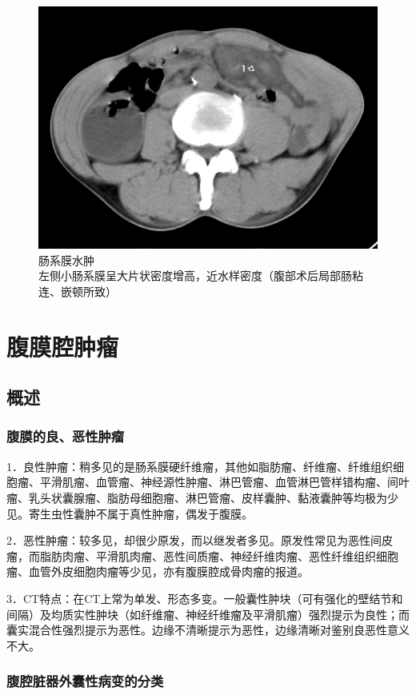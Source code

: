\begin{figure}[!htbp]
 \centering
 \includegraphics[width=.7\textwidth,height=\textheight,keepaspectratio]{./images/Image00376.jpg}
 \captionsetup{justification=centering}
 \caption{肠系膜水肿\\{\small 左侧小肠系膜呈大片状密度增高，近水样密度（腹部术后局部肠粘连、嵌顿所致）}}
 \label{fig18-6}
  \end{figure} 

\section{腹膜腔肿瘤}

\subsection{概述}

\subsubsection{腹膜的良、恶性肿瘤}

1．良性肿瘤：稍多见的是肠系膜硬纤维瘤，其他如脂肪瘤、纤维瘤、纤维组织细胞瘤、平滑肌瘤、血管瘤、神经源性肿瘤、淋巴管瘤、血管淋巴管样错构瘤、间叶瘤、乳头状囊腺瘤、脂肪母细胞瘤、淋巴管瘤、皮样囊肿、黏液囊肿等均极为少见。寄生虫性囊肿不属于真性肿瘤，偶发于腹膜。

2．恶性肿瘤：较多见，却很少原发，而以继发者多见。原发性常见为恶性间皮瘤，而脂肪肉瘤、平滑肌肉瘤、恶性间质瘤、神经纤维肉瘤、恶性纤维组织细胞瘤、血管外皮细胞肉瘤等少见，亦有腹膜腔成骨肉瘤的报道。

3．CT特点：在CT上常为单发、形态多变。一般囊性肿块（可有强化的壁结节和间隔）及均质实性肿块（如纤维瘤、神经纤维瘤及平滑肌瘤）强烈提示为良性；而囊实混合性强烈提示为恶性。边缘不清晰提示为恶性，边缘清晰对鉴别良恶性意义不大。

\subsubsection{腹腔脏器外囊性病变的分类}

